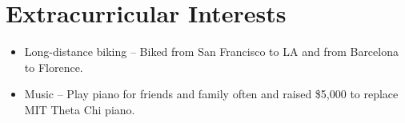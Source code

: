 \documentclass[letterpaper,10pt]{article} %
\newcommand{\CVItem}[1]{
  \item\small{
    {#1 \vspace{-3pt}}
  }
}
\begin{document}
\section{Extracurricular Interests}
\begin{itemize}
    \CVItem{Long-distance biking -- Biked from San Francisco to LA and from Barcelona to Florence.}
    \CVItem{Music -- Play piano for friends and family often and raised \$5,000 to replace MIT Theta Chi piano.}
\end{itemize}

\end{document}
